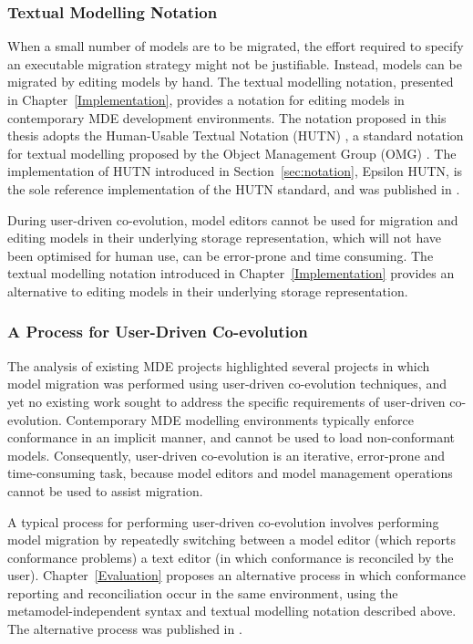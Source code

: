 \subsubsection{Textual Modelling Notation}
When a small number of models are to be migrated, the effort required to specify an executable migration strategy might not be justifiable. Instead, models can be migrated by editing models by hand. The textual modelling notation, presented in Chapter~\ref{Implementation}, provides a notation for editing models in contemporary MDE development environments. The notation proposed in this thesis adopts the Human-Usable Textual Notation (HUTN) \cite{hutn}, a standard notation for textual modelling proposed by the Object Management Group (OMG) \cite{omg}. The implementation of HUTN introduced in Section~\ref{sec:notation}, Epsilon HUTN, is the sole reference implementation of the HUTN standard, and was published in \cite{rose08hutn}.

During user-driven co-evolution, model editors cannot be used for migration and editing models in their underlying storage representation, which will not have been optimised for human use, can be error-prone and time consuming. The textual modelling notation introduced in Chapter~\ref{Implementation} provides an alternative to editing models in their underlying storage representation.


\subsubsection{A Process for User-Driven Co-evolution}
The analysis of existing MDE projects highlighted several projects in which model migration was performed using user-driven co-evolution techniques, and yet no existing work sought to address the specific requirements of user-driven co-evolution. Contemporary MDE modelling environments typically enforce conformance in an implicit manner, and cannot be used to load non-conformant models. Consequently, user-driven co-evolution is an iterative, error-prone and time-consuming task, because model editors and model management operations cannot be used to assist migration.

A typical process for performing user-driven co-evolution involves performing model migration by repeatedly switching between a model editor (which reports conformance problems) a text editor (in which conformance is reconciled by the user). Chapter~\ref{Evaluation} proposes an alternative process in which conformance reporting and reconciliation occur in the same environment, using the metamodel-independent syntax and textual modelling notation described above. The alternative process was published in \cite{rose09enhanced}.


